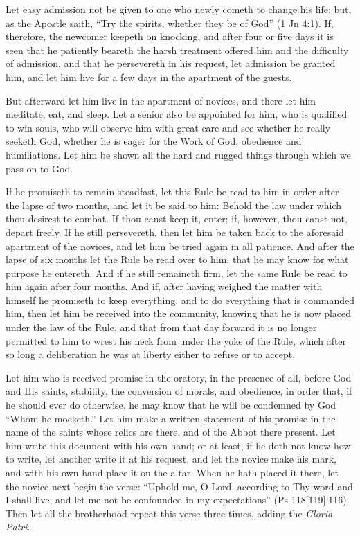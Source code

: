 Let easy admission not be given to one who newly cometh to change his life; but, as the Apostle saith, ``Try the spirits, whether they be of God'' (1 Jn 4:1). If, therefore, the newcomer keepeth on knocking, and after four or five days it is seen that he patiently beareth the harsh treatment offered him and the difficulty of admission, and that he persevereth in his request, let admission be granted him, and let him live for a few days in the apartment of the guests.

But afterward let him live in the apartment of novices, and there let him meditate, eat, and sleep. Let a senior also be appointed for him, who is qualified to win souls, who will observe him with great care and see whether he really seeketh God, whether he is eager for the Work of God, obedience and humiliations. Let him be shown all the hard and rugged things through which we pass on to God.

If he promiseth to remain steadfast, let this Rule be read to him in order after the lapse of two months, and let it be said to him: Behold the law under which thou desirest to combat. If thou canst keep it, enter; if, however, thou canst not, depart freely. If he still persevereth, then let him be taken back to the aforesaid apartment of the novices, and let him be tried again in all patience. And after the lapse of six months let the Rule be read over to him, that he may know for what purpose he entereth. And if he still remaineth firm, let the same Rule be read to him again after four months. And if, after having weighed the matter with himself he promiseth to keep everything, and to do everything that is commanded him, then let him be received into the community, knowing that he is now placed under the law of the Rule, and that from that day forward it is no longer permitted to him to wrest his neck from under the yoke of the Rule, which after so long a deliberation he was at liberty either to refuse or to accept.

Let him who is received promise in the oratory, in the presence of all, before God and His saints, stability, the conversion of morals, and obedience, in order that, if he should ever do otherwise, he may know that he will be condemned by God ``Whom he mocketh.'' Let him make a written statement of his promise in the name of the saints whose relics are there, and of the Abbot there present. Let him write this document with his own hand; or at least, if he doth not know how to write, let another write it at his request, and let the novice make his mark, and with his own hand place it on the altar. When he hath placed it there, let the novice next begin the verse: ``Uphold me, O Lord, according to Thy word and I shall live; and let me not be confounded in my expectations'' (Ps 118[119]:116). Then let all the brotherhood repeat this verse three times, adding the \emph{Gloria Patri}.

